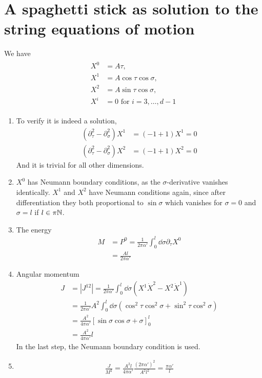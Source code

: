 \section{A spaghetti stick as solution to the string equations of motion}
We have 
\begin{align}
	\begin{split}
		X^0 &= A \tau, \\
		X^1 &= A \cos\tau \cos\sigma, \\
		X^2 &= A \sin\tau\cos\sigma,  \\
		X^i &=0 \text{ for } i=3,\dots,d-1
	\end{split}
\end{align}
\begin{enumerate}[label=(\alph*)]
	\item To verify it is indeed a solution,
		\begin{align*}
			(\partial_\tau^2 - \partial_\sigma^2) X^1 &= (-1 + 1) X^1 = 0 \\
			(\partial_\tau^2 - \partial_\sigma^2) X^2 &= (-1 + 1) X^2 = 0
		\end{align*}
		And it is trivial for all other dimensions.

	\item $X^0$ has Neumann boundary conditions, as the $\sigma$-derivative vanishes identically. $X^1$ and $X^2$ have Neumann conditions again, since after differentiation they both proportional to $\sin\sigma$ which vanishes for $\sigma=0$ and $\sigma=l$ if $l \in \pi \mathbb{N}$.

	\item The energy
		\begin{align*}
			M &= P^0 = \frac{1}{2\pi \alpha'} \int_0^l \dd{\sigma} \partial_\tau X^0 \\
			  &= \frac{Al}{2\pi\alpha'} 
		\end{align*}

	\item Angular momentum
		\begin{align*}
			J &= |J^{12}| = \frac{1}{2\pi\alpha'} \int_0^l \dd{\sigma} \left( X^1 \dot{X}^2 - X^2 \dot{X}^1 \right) \\
			  &= \frac{1}{2\pi\alpha'} A^2 \int_0^l \dd{\sigma} \left( \cos^2\tau \cos^2\sigma + \sin^2\tau \cos^2\sigma \right) \\
			  &= \frac{A^2}{4\pi\alpha'} \left[ \sin\sigma \cos\sigma + \sigma \right]_0^l \\
			  &= \frac{A^2}{4\pi \alpha'} l
		\end{align*}
		In the last step, the Neumann boundary condition is used.

	\item 
		\begin{align*}
			\frac{J}{M^2} = \frac{A^2l}{4\pi \alpha'} \frac{(2\pi \alpha')^2}{A^2l^2} = \frac{\pi \alpha'}{l}
		\end{align*}
\end{enumerate}
